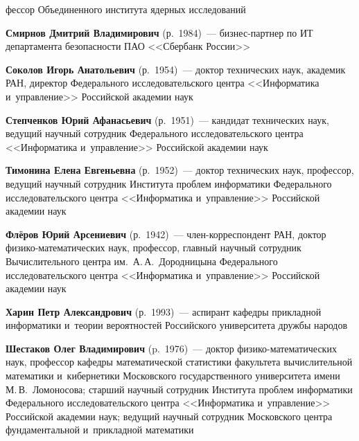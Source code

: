\begin{multicols}{2}
\noindent
фессор Объединенного института ядерных исследований

\vspace*{2pt}

 
 \noindent
\textbf{Смирнов Дмитрий Владимирович} (р.\ 1984)~--- биз\-нес-парт\-нер по ИТ 
департамента безопас\-ности ПАО <<Сбербанк России>>

 \vspace*{2pt}
 
 
 \noindent
\textbf{Соколов Игорь Анатольевич} (р.\ 1954)~--- 
доктор технических наук, академик РАН, директор Федерального исследовательского цент\-ра 
<<Информатика и~управ\-ле\-ние>> Российской академии наук

\vspace*{2pt}
 
 \noindent
\textbf{Степченков Юрий Афанасьевич} (р.\ 1951)~--- кандидат технических наук,
 ведущий научный сотрудник Федерального исследовательского цент\-ра <<Информатика и~управ\-ле\-ние>>
  Российской академии наук





 \vspace*{2pt}
 
 \noindent
\textbf{Тимонина Елена Евгеньевна} (р.\ 1952)~--- 
доктор технических наук, профессор, ведущий научный со\-труд\-ник Института проб\-лем 
информатики Федерального исследовательского цент\-ра <<\mbox{Информатика} и~управ\-ле\-ние>> Российской академии наук

\vspace*{2pt}


\noindent
\textbf{Флёров Юрий Арсениевич} (р.\ 1942)~--- член-кор\-рес\-пон\-дент РАН, 
доктор фи\-зи\-ко-ма\-те\-ма\-ти\-че\-ских наук, профессор, 
главный научный со\-труд\-ник Вычислительного цент\-ра им.\ А.\,А.~Дородницына 
Федерального исследовательского цент\-ра <<Информатика и~управ\-ле\-ние>> Российской академии наук


\vspace*{2pt}

\noindent
\textbf{Харин Петр Александрович} (р.\ 1993)~--- 
аспирант кафедры прикладной информатики и~тео\-рии вероятностей Российского университета друж\-бы народов

\vspace*{2pt}

\noindent
\textbf{Шестаков Олег Владимирович} (p.\ 1976)~--- 
доктор фи\-зи\-ко-ма\-те\-ма\-ти\-че\-ских наук, профессор ка\-фед\-ры\linebreak 
математической статистики факультета вы\-чис\-ли\-тель\-ной математики 
и~кибернетики Московского государственного университета имени М.\,В.~Ломоносова; 
старший научный сотрудник \mbox{Института} проб\-лем информатики Федерального исследовательского цент\-ра 
<<Информатика и~управ\-ле\-ние>> Российской академии наук; 
ведущий научный со\-труд\-ник Московского цент\-ра фундаментальной и~при\-клад\-ной математики


\end{multicols}
